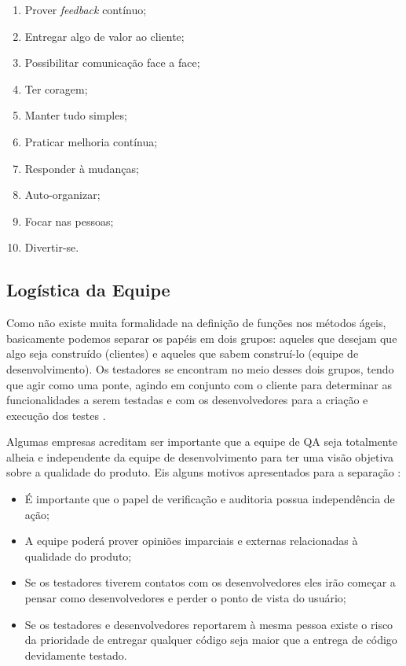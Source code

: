 \documentclass[
	12pt,				%
	openright,			%
	oneside,			%
	a4paper,			%
	english,			%
	brazil,				%
	]{abntex2}
\begin{document}
\begin{enumerate}
    \item Prover \emph{feedback} contínuo;
    \item Entregar algo de valor ao cliente;
    \item Possibilitar comunicação face a face;
    \item Ter coragem;
    \item Manter tudo simples;
    \item Praticar melhoria contínua;
    \item Responder à mudanças;
    \item Auto-organizar;
    \item Focar nas pessoas;
    \item Divertir-se.
\end{enumerate}

\subsection{Logística da Equipe}
Como não existe muita formalidade na definição de funções nos métodos ágeis, basicamente podemos separar os papéis em dois grupos: aqueles que desejam que algo seja construído (clientes) e aqueles que sabem construí-lo (equipe de desenvolvimento). Os testadores se encontram no meio desses dois grupos, tendo que agir como uma ponte, agindo em conjunto com o cliente para determinar as funcionalidades a serem testadas e com os desenvolvedores para a criação e execução dos testes \cite{rasmusson2010}.

Algumas empresas acreditam ser importante que a equipe de QA seja totalmente alheia e independente da equipe de desenvolvimento para ter uma visão objetiva sobre a qualidade do produto. Eis alguns motivos apresentados para a separação \cite{crispin2009}:

\begin{itemize}
    \item É importante que o papel de verificação e auditoria possua independência de ação;
    \item A equipe poderá prover opiniões imparciais e externas relacionadas à qualidade do produto;
    \item Se os testadores tiverem contatos com os desenvolvedores eles irão começar a pensar como desenvolvedores e perder o ponto de vista do usuário;
    \item Se os testadores e desenvolvedores reportarem à mesma pessoa existe o risco da prioridade de entregar qualquer código seja maior que a entrega de código devidamente testado.
\end{itemize}
\end{document}
